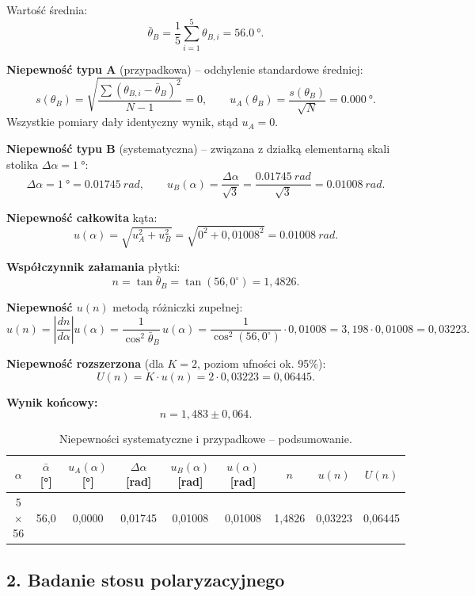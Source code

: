 \documentclass[a4paper,12pt]{article}
\begin{document}
Wartość średnia:
\[
\bar{\theta}_B = \frac{1}{5}\sum_{i=1}^{5}\theta_{B,i} = \SI{56,0}{\degree}.
\]

\textbf{Niepewność typu A} (przypadkowa) -- odchylenie standardowe średniej:
\[
s(\theta_B) = \sqrt{\frac{\sum(\theta_{B,i}-\bar{\theta}_B)^2}{N-1}} = 0,\qquad
u_A(\theta_B) = \frac{s(\theta_B)}{\sqrt{N}} = \SI{0,000}{\degree}.
\]
Wszystkie pomiary dały identyczny wynik, stąd $u_A = 0$.

\textbf{Niepewność typu B} (systematyczna) -- związana z działką elementarną skali
stolika $\Delta\alpha = \SI{1}{\degree}$:
\[
\Delta\alpha = \SI{1}{\degree} = \SI{0,01745}{rad},\qquad
u_B(\alpha) = \frac{\Delta\alpha}{\sqrt{3}} = \frac{\SI{0,01745}{rad}}{\sqrt{3}}
= \SI{0,01008}{rad}.
\]

\textbf{Niepewność całkowita} kąta:
\[
u(\alpha) = \sqrt{u_A^2 + u_B^2} = \sqrt{0^2 + 0{,}01008^2} = \SI{0,01008}{rad}.
\]

\textbf{Współczynnik załamania} płytki:
\[
n = \tan\bar{\theta}_B = \tan(56{,}0^\circ) = 1{,}4826.
\]

\textbf{Niepewność $u(n)$} metodą różniczki zupełnej:
\[
u(n) = \left|\frac{dn}{d\alpha}\right| u(\alpha)
= \frac{1}{\cos^2\bar{\theta}_B}\,u(\alpha)
= \frac{1}{\cos^2(56{,}0^\circ)} \cdot 0{,}01008
= 3{,}198 \cdot 0{,}01008 = 0{,}03223.
\]

\textbf{Niepewność rozszerzona} (dla $K = 2$, poziom ufności ok. 95\%):
\[
U(n) = K \cdot u(n) = 2 \cdot 0{,}03223 = 0{,}06445.
\]

\textbf{Wynik końcowy:}
\[
\boxed{n = 1{,}483 \pm 0{,}064}.
\]

\begin{table}[H]
\centering
\caption{Niepewności systematyczne i przypadkowe -- podsumowanie.}
\renewcommand{\arraystretch}{1.3}
\small
\begin{tabular}{c S[table-format=2.1] S[table-format=1.4] S[table-format=1.5] S[table-format=1.5] S[table-format=1.5] S[table-format=1.4] S[table-format=1.5] S[table-format=1.5]}
\toprule
{$\alpha$} & {$\bar{\alpha}$ [\si{\degree}]} & {$u_A(\alpha)$ [\si{\degree}]} & {$\Delta\alpha$ [rad]} & {$u_B(\alpha)$ [rad]} & {$u(\alpha)$ [rad]} & {$n$} & {$u(n)$} & {$U(n)$} \\
$\times$56 & 56,0 & 0,0000 & 0,01745 & 0,01008 & 0,01008 & 1,4826 & 0,03223 & 0,06445 \\
\bottomrule
\end{tabular}
\end{table}

\subsection*{2. Badanie stosu polaryzacyjnego}
\end{document}
